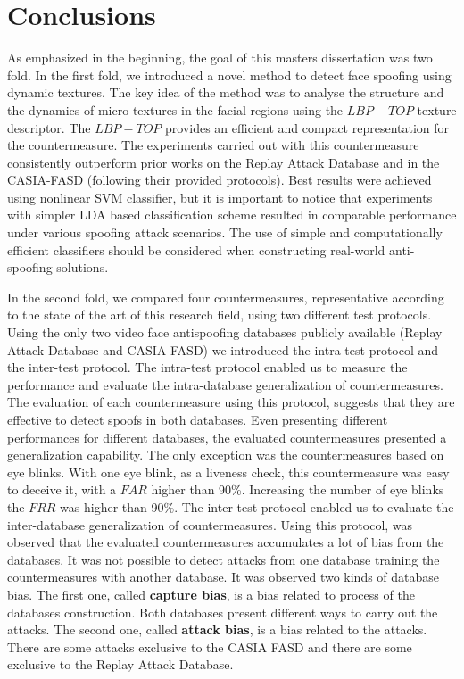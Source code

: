 \chapter{Conclusions}
\label{chap:Conclusions}

As emphasized in the beginning, the goal of this masters dissertation was two fold. In the first fold, we introduced a novel method to detect face spoofing using dynamic textures. The key idea of the method was to analyse the structure and the dynamics of micro-textures in the facial regions using the $LBP-TOP$ texture descriptor. The $LBP-TOP$ provides an efficient and compact representation for the countermeasure. The experiments carried out with this countermeasure consistently outperform prior works on the Replay Attack Database and in the CASIA-FASD (following their provided protocols). Best results were achieved using nonlinear SVM classifier, but it is important to notice that experiments with simpler LDA based classification scheme resulted in comparable performance under various spoofing attack scenarios. The use of simple and computationally efficient classifiers should be considered when constructing real-world anti-spoofing solutions.

In the second fold, we compared four countermeasures, representative according to the state of the art of this research field, using two different test protocols. Using the only two video face antispoofing databases publicly available (Replay Attack Database and CASIA FASD) we introduced the intra-test protocol and the inter-test protocol. The intra-test protocol enabled us to measure the performance and evaluate the intra-database generalization of countermeasures. The evaluation of each countermeasure using this protocol, suggests that they are effective to detect spoofs in both databases. Even presenting different performances for different databases, the evaluated countermeasures presented a generalization capability. The only exception was the countermeasures based on eye blinks. With one eye blink, as a liveness check, this countermeasure was easy to deceive it, with a $FAR$ higher than 90\%. Increasing the number of eye blinks the $FRR$ was higher than 90\%. The inter-test protocol enabled us to evaluate the inter-database generalization of countermeasures. Using this protocol, was observed that the evaluated countermeasures accumulates a lot of bias from the databases. It was not possible to detect attacks from one database training the countermeasures with another database. It was observed two kinds of database bias. The first one, called \textbf{capture bias}, is a bias related to process of the databases construction. Both databases present different ways to carry out the attacks. The second one, called \textbf{attack bias}, is a bias related to the attacks. There are some attacks exclusive to the CASIA FASD and there are some exclusive to the Replay Attack Database.

